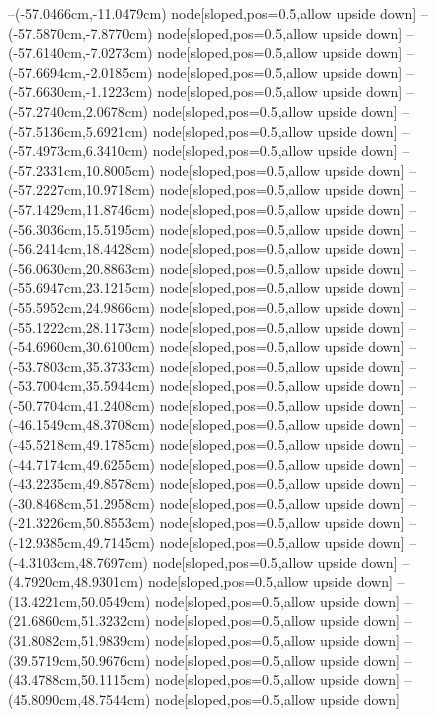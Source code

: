 --(-57.0466cm,-11.0479cm) node[sloped,pos=0.5,allow upside down]{\ArrowIn}
--(-57.5870cm,-7.8770cm) node[sloped,pos=0.5,allow upside down]{\ArrowIn}
--(-57.6140cm,-7.0273cm) node[sloped,pos=0.5,allow upside down]{\arrowIn}
--(-57.6694cm,-2.0185cm) node[sloped,pos=0.5,allow upside down]{\ArrowIn}
--(-57.6630cm,-1.1223cm) node[sloped,pos=0.5,allow upside down]{\arrowIn}
--(-57.2740cm,2.0678cm) node[sloped,pos=0.5,allow upside down]{\ArrowIn}
--(-57.5136cm,5.6921cm) node[sloped,pos=0.5,allow upside down]{\ArrowIn}
--(-57.4973cm,6.3410cm) node[sloped,pos=0.5,allow upside down]{\arrowIn}
--(-57.2331cm,10.8005cm) node[sloped,pos=0.5,allow upside down]{\ArrowIn}
--(-57.2227cm,10.9718cm) node[sloped,pos=0.5,allow upside down]{\arrowIn}
--(-57.1429cm,11.8746cm) node[sloped,pos=0.5,allow upside down]{\arrowIn}
--(-56.3036cm,15.5195cm) node[sloped,pos=0.5,allow upside down]{\ArrowIn}
--(-56.2414cm,18.4428cm) node[sloped,pos=0.5,allow upside down]{\ArrowIn}
--(-56.0630cm,20.8863cm) node[sloped,pos=0.5,allow upside down]{\ArrowIn}
--(-55.6947cm,23.1215cm) node[sloped,pos=0.5,allow upside down]{\ArrowIn}
--(-55.5952cm,24.9866cm) node[sloped,pos=0.5,allow upside down]{\ArrowIn}
--(-55.1222cm,28.1173cm) node[sloped,pos=0.5,allow upside down]{\ArrowIn}
--(-54.6960cm,30.6100cm) node[sloped,pos=0.5,allow upside down]{\ArrowIn}
--(-53.7803cm,35.3733cm) node[sloped,pos=0.5,allow upside down]{\ArrowIn}
--(-53.7004cm,35.5944cm) node[sloped,pos=0.5,allow upside down]{\arrowIn}
--(-50.7704cm,41.2408cm) node[sloped,pos=0.5,allow upside down]{\ArrowIn}
--(-46.1549cm,48.3708cm) node[sloped,pos=0.5,allow upside down]{\ArrowIn}
--(-45.5218cm,49.1785cm) node[sloped,pos=0.5,allow upside down]{\ArrowIn}
--(-44.7174cm,49.6255cm) node[sloped,pos=0.5,allow upside down]{\arrowIn}
--(-43.2235cm,49.8578cm) node[sloped,pos=0.5,allow upside down]{\ArrowIn}
--(-30.8468cm,51.2958cm) node[sloped,pos=0.5,allow upside down]{\ArrowIn}
--(-21.3226cm,50.8553cm) node[sloped,pos=0.5,allow upside down]{\ArrowIn}
--(-12.9385cm,49.7145cm) node[sloped,pos=0.5,allow upside down]{\ArrowIn}
--(-4.3103cm,48.7697cm) node[sloped,pos=0.5,allow upside down]{\ArrowIn}
--(4.7920cm,48.9301cm) node[sloped,pos=0.5,allow upside down]{\ArrowIn}
--(13.4221cm,50.0549cm) node[sloped,pos=0.5,allow upside down]{\ArrowIn}
--(21.6860cm,51.3232cm) node[sloped,pos=0.5,allow upside down]{\ArrowIn}
--(31.8082cm,51.9839cm) node[sloped,pos=0.5,allow upside down]{\ArrowIn}
--(39.5719cm,50.9676cm) node[sloped,pos=0.5,allow upside down]{\ArrowIn}
--(43.4788cm,50.1115cm) node[sloped,pos=0.5,allow upside down]{\ArrowIn}
--(45.8090cm,48.7544cm) node[sloped,pos=0.5,allow upside down]{\ArrowIn}
